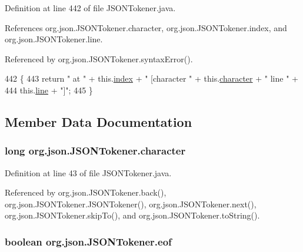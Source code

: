 Definition at line 442 of file J\-S\-O\-N\-Tokener.\-java.



References org.\-json.\-J\-S\-O\-N\-Tokener.\-character, org.\-json.\-J\-S\-O\-N\-Tokener.\-index, and org.\-json.\-J\-S\-O\-N\-Tokener.\-line.



Referenced by org.\-json.\-J\-S\-O\-N\-Tokener.\-syntax\-Error().


\begin{DoxyCode}
442                              \{
443         \textcolor{keywordflow}{return} \textcolor{stringliteral}{" at "} + this.\hyperlink{classorg_1_1json_1_1_j_s_o_n_tokener_aee137d262ad66a4cf877626a5549a69b}{index} + \textcolor{stringliteral}{" [character "} + this.\hyperlink{classorg_1_1json_1_1_j_s_o_n_tokener_a1d8ca24139964e139f7b020d7cc4202e}{character} + \textcolor{stringliteral}{" line "} +
444             this.\hyperlink{classorg_1_1json_1_1_j_s_o_n_tokener_ad906cc46c2380d59b17549770823fb60}{line} + \textcolor{stringliteral}{"]"};
445     \}
\end{DoxyCode}


\subsection{Member Data Documentation}
\hypertarget{classorg_1_1json_1_1_j_s_o_n_tokener_a1d8ca24139964e139f7b020d7cc4202e}{
\subsubsection[{character}]{\setlength{\rightskip}{0pt plus 5cm}long org.\-json.\-J\-S\-O\-N\-Tokener.\-character\hspace{0.3cm}{\ttfamily [private]}}}\label{classorg_1_1json_1_1_j_s_o_n_tokener_a1d8ca24139964e139f7b020d7cc4202e}


Definition at line 43 of file J\-S\-O\-N\-Tokener.\-java.



Referenced by org.\-json.\-J\-S\-O\-N\-Tokener.\-back(), org.\-json.\-J\-S\-O\-N\-Tokener.\-J\-S\-O\-N\-Tokener(), org.\-json.\-J\-S\-O\-N\-Tokener.\-next(), org.\-json.\-J\-S\-O\-N\-Tokener.\-skip\-To(), and org.\-json.\-J\-S\-O\-N\-Tokener.\-to\-String().

\hypertarget{classorg_1_1json_1_1_j_s_o_n_tokener_a17b6112399b7b89f4152e3d7178aeed8}{
\subsubsection[{eof}]{\setlength{\rightskip}{0pt plus 5cm}boolean org.\-json.\-J\-S\-O\-N\-Tokener.\-eof\hspace{0.3cm}{\ttfamily [private]}}}\label{classorg_1_1json_1_1_j_s_o_n_tokener_a17b6112399b7b89f4152e3d7178aeed8}


